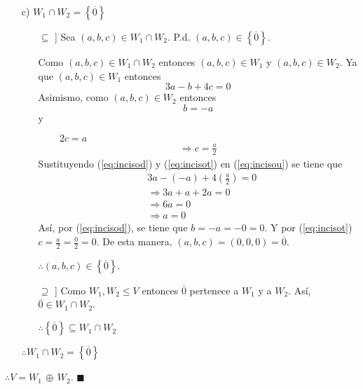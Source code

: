 \documentclass[fleqn]{article}                       %
\begin{document}
\begin{enumerate}
\begin{enumerate}
            \item[c)] $ W_1 \cap W_2 = \left \{\overline{0} \right \} $
            \begin{enumerate}
                \item[$ \subseteq $]] Sea $ (a,b,c) \in W_1 \cap W_2 $. P.d. $ (a,b,c) \in \left \{\overline{0} \right \} $.

                Como $ (a,b,c) \in W_1 \cap W_2 $ entonces $ (a,b,c) \in W_1 $ y $ (a,b,c) \in W_2 $. Ya que $ (a,b,c) \in W_1 $ entonces 
                \begin{equation}
                    3a - b + 4c = 0
                    \label{eq:incisou}
                \end{equation}
                Asimismo, como $ (a,b,c) \in W_2 $ entonces 
                \begin{equation}
                    b = -a 
                    \label{eq:incisod}
                \end{equation} 
                y \par
                $ \quad \quad \, 2c = a $
                \begin{align}
                    \Longrightarrow c = \frac{a}{2}
                    \label{eq:incisot}
                \end{align}
                Sustituyendo (\ref{eq:incisod}) y (\ref{eq:incisot}) en (\ref{eq:incisou}) se tiene que
                \begin{align*}
                    & 3a - (-a) + 4 \left( \frac{a}{2} \right) = 0 \\
                    & \Longrightarrow 3a + a + 2a = 0 \\
                    & \Longrightarrow 6a = 0 \\
                    & \Longrightarrow a = 0
                \end{align*}
                Así, por (\ref{eq:incisod}), se tiene que $ b = -a = -0 = 0 $. Y por (\ref{eq:incisot}) $ c = \displaystyle \frac{a}{2} = \frac{0}{2} = 0 $. De esta manera, $ (a,b,c) = (0,0,0) = \overline{0} $. \par
                $ \therefore (a,b,c) \in \left \{\overline{0} \right \} $.

                \item[$ \supseteq $]] Como $ W_1, W_2 \leq V $ entonces $ \overline{0} $ pertenece a $ W_1 $ y a $ W_2 $. Así, $ \overline{0} \in W_1 \cap W_2 $. \par 

                $ \therefore \left\{\overline{0} \right\} \subseteq W_1 \cap W_2 $
            \end{enumerate}
            $ \therefore W_1 \cap W_2 = \left \{\overline{0} \right \} $
        \end{enumerate}
        $ \therefore V = W_1 \, \oplus \, W_2 $. $ \blacksquare $
    \end{enumerate}
\end{document}
